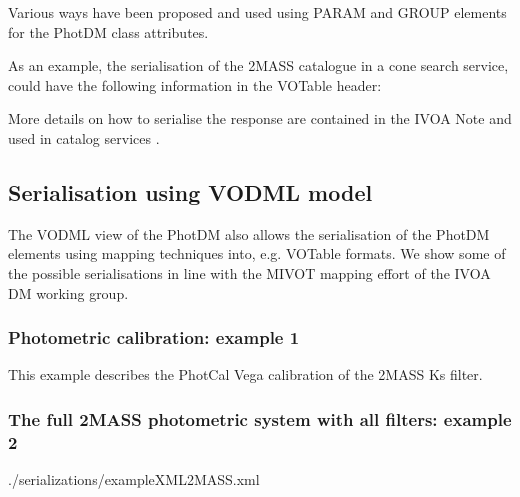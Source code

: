 \documentclass[11pt,a4paper]{ivoa}
\begin{document}
\begin{appendices}
Various ways have been proposed and used using PARAM and GROUP elements for the PhotDM class attributes. 

As an example, the serialisation of the 2MASS catalogue in a cone search service,
could have the following information in the VOTable header:
\par


More details on how to serialise the response are contained in the IVOA Note \citep{derriere} and used in catalog services .

\subsection{Serialisation using VODML model} \label{appendixmapping}
The VODML view of the PhotDM also allows the serialisation of the PhotDM elements
using mapping techniques into, e.g. VOTable formats. We show some of the possible
serialisations in line with the MIVOT mapping effort of the IVOA DM working group.

\subsubsection{Photometric calibration:  example 1}
This example describes the PhotCal Vega calibration of the 2MASS Ks filter.
\par



 \subsubsection{The full 2MASS photometric system with all filters: example 2}


 {./serializations/exampleXML2MASS.xml}

\end{appendices}


\end{document}
